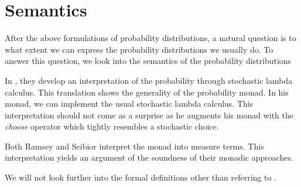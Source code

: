 \section{Semantics}
After the above formulations of probability distributions, a natural question
is to what extent we can express the probability distributions we
usually do. To answer this question, we look into the semantics of the
probability distributions

In \cite{Ramsey:2002}, they develop an interpretation of the probability through
stochastic lambda calculus. This translation shows the generality of the probability
monad. In his monad, we can implement the usual stochastic lambda
calculus. This interpretation should not come as a surprise as he
augments his monad with the
\emph{choose} operator which tightly resembles a stochastic choice.

Both Ramsey and Scibior interpret the monad into measure terms.
This interpretation yields an argument of the soundness of their monadic approaches.

We will not look further into the formal definitions other than referring
to \cite{Ramsey:2002, Scibior:2015}.